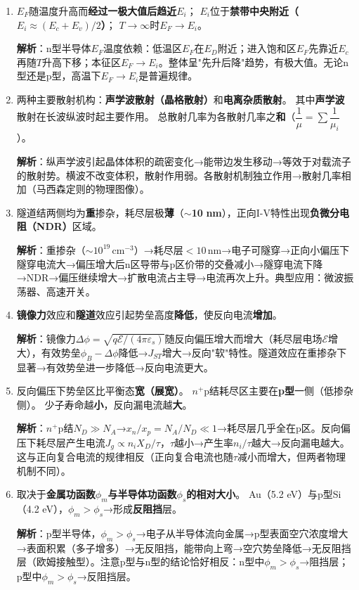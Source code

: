 \documentclass[12pt,a4paper]{ctexart}
\begin{document}
\begin{enumerate}[label=\arabic*.,nosep,leftmargin=2em]

\item
$E_F$随温度升高而\textbf{经过一极大值后趋近$E_i$}；
$E_i$位于\textbf{禁带中央附近（$E_i \approx (E_c+E_v)/2$）}；
$T \to \infty$时$E_F \to E_i$。

\textbf{解析}：n型半导体$E_F$温度依赖：低温区$E_F$在$E_D$附近；进入饱和区$E_F$先靠近$E_c$再随$T$升高下移；本征区$E_F \to E_i$。整体呈"先升后降"趋势，有极大值。无论n型还是p型，高温下$E_F \to E_i$是普遍规律。

\item
两种主要散射机构：\textbf{声学波散射（晶格散射）}和\textbf{电离杂质散射}。
其中\textbf{声学波}散射在长波纵波时起主要作用。
总散射几率为各散射几率之\textbf{和}（$\dfrac{1}{\mu} = \sum \dfrac{1}{\mu_i}$）。

\textbf{解析}：纵声学波引起晶体体积的疏密变化→能带边发生移动→等效于对载流子的散射势。横波不改变体积，散射作用弱。各散射机制独立作用→散射几率相加（马西森定则的物理图像）。

\item
隧道结两侧均为\textbf{重}掺杂，耗尽层极\textbf{薄}（$\sim$\textbf{10\,\,nm}），正向I-V特性出现\textbf{负微分电阻（NDR）}区域。

\textbf{解析}：重掺杂（$\sim10^{19}\,\text{cm}^{-3}$）→耗尽层$<10\,\text{nm}$→电子可隧穿→正向小偏压下隧穿电流大→偏压增大后n区导带与p区价带的交叠减小→隧穿电流下降→NDR→偏压继续增大→扩散电流占主导→电流再次上升。典型应用：微波振荡器、高速开关。

\item
\textbf{镜像力}效应和\textbf{隧道}效应引起势垒高度\textbf{降低}，使反向电流\textbf{增加}。

\textbf{解析}：镜像力$\Delta\phi = \sqrt{q\mathcal{E}/(4\pi\varepsilon_s)}$随反向偏压增大而增大（耗尽层电场$\mathcal{E}$增大），有效势垒$\phi_B - \Delta\phi$降低→$J_{ST}$增大→反向"软"特性。隧道效应在重掺杂下显著→有效势垒进一步降低→反向电流更大。

\item
反向偏压下势垒区比平衡态\textbf{宽（展宽）}。
$n^+$p结耗尽区主要在\textbf{p型}一侧（低掺杂侧）。
少子寿命越\textbf{小}，反向漏电流越\textbf{大}。

\textbf{解析}：$n^+$p结$N_D \gg N_A$→$x_n/x_p = N_A/N_D \ll 1$→耗尽层几乎全在p区。反向偏压下耗尽层产生电流$J_g \propto n_i X_D/\tau$，$\tau$越小→产生率$n_i/\tau$越大→反向漏电越大。这与正向复合电流的规律相反（正向复合电流也随$\tau$减小而增大，但两者物理机制不同）。

\item
取决于\textbf{金属功函数$\phi_m$与半导体功函数$\phi_s$的相对大小}。
Au（5.2 eV）与p型Si（4.2 eV），$\phi_m > \phi_s$→形成\textbf{反阻挡}层。

\textbf{解析}：p型半导体，$\phi_m > \phi_s$→电子从半导体流向金属→p型表面空穴浓度增大→表面积累（多子增多）→无反阻挡，能带向上弯→空穴势垒降低→无反阻挡层（欧姆接触型）。注意p型与n型的结论恰好相反：n型中$\phi_m > \phi_s$→阻挡层；p型中$\phi_m > \phi_s$→反阻挡层。

\end{enumerate}
\end{document}
